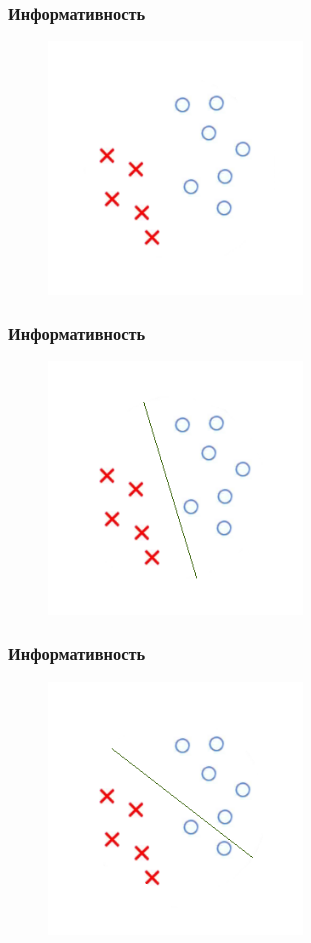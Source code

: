 \documentclass[12pt]{beamer}
\begin{document}
\begin{frame}\frametitle{Информативность}
\begin{figure}[htbp]
  \includegraphics[height=190pt, keepaspectratio = true]{images/dtree_1}   
\end{figure}
\end{frame}

\begin{frame}\frametitle{Информативность}
\begin{figure}[htbp]
  \includegraphics[height=190pt, keepaspectratio = true]{images/dtree_2}   
\end{figure}
\end{frame}

\begin{frame}\frametitle{Информативность}
\begin{figure}[htbp]
  \includegraphics[height=190pt, keepaspectratio = true]{images/dtree_3}   
\end{figure}
\end{frame}
\end{document}
